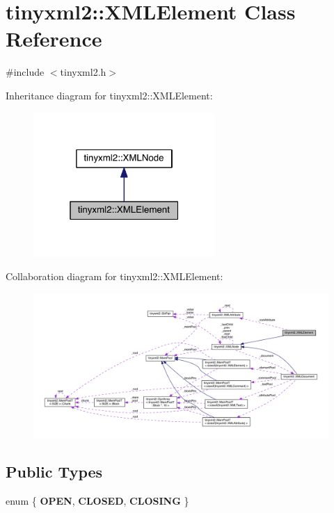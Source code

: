 \hypertarget{classtinyxml2_1_1_x_m_l_element}{}\section{tinyxml2\+:\+:X\+M\+L\+Element Class Reference}
\label{classtinyxml2_1_1_x_m_l_element}


{\ttfamily \#include $<$tinyxml2.\+h$>$}



Inheritance diagram for tinyxml2\+:\+:X\+M\+L\+Element\+:\nopagebreak
\begin{figure}[H]
\begin{center}
\leavevmode
\includegraphics[width=196pt]{classtinyxml2_1_1_x_m_l_element__inherit__graph}
\end{center}
\end{figure}


Collaboration diagram for tinyxml2\+:\+:X\+M\+L\+Element\+:\nopagebreak
\begin{figure}[H]
\begin{center}
\leavevmode
\includegraphics[width=350pt]{classtinyxml2_1_1_x_m_l_element__coll__graph}
\end{center}
\end{figure}
\subsection*{Public Types}
\begin{DoxyCompactItemize}
\item 
\hypertarget{classtinyxml2_1_1_x_m_l_element_a07a6ce25c17aaa505933db57f2373e50}{}enum \{ {\bfseries O\+P\+E\+N}, 
{\bfseries C\+L\+O\+S\+E\+D}, 
{\bfseries C\+L\+O\+S\+I\+N\+G}
 \}\label{classtinyxml2_1_1_x_m_l_element_a07a6ce25c17aaa505933db57f2373e50}

\end{DoxyCompactItemize}
